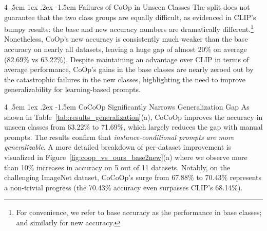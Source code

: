 \documentclass[10pt,twocolumn,letterpaper]{article}
\makeatletter
\renewcommand\paragraph{
  \@startsection{paragraph} {4} {\z@} {.5em \@plus1ex \@minus.2ex} {-1.5em} {\normalfont\normalsize\bfseries} }
\makeatother
\begin{document}
\paragraph{Failures of CoOp in Unseen Classes}
The split does not guarantee that the two class groups are equally difficult, as evidenced in CLIP's bumpy results: the base and new accuracy numbers are dramatically different.\footnote{For convenience, we refer to base accuracy as the performance in base classes; and similarly for new accuracy.} Nonetheless, CoOp's new accuracy is consistently much weaker than the base accuracy on nearly all datasets, leaving a huge gap of almost 20\% on average (82.69\% vs 63.22\%). Despite maintaining an advantage over CLIP in terms of average performance, CoOp's gains in the base classes are nearly zeroed out by the catastrophic failures in the new classes, highlighting the need to improve generalizability for learning-based prompts.

\paragraph{CoCoOp Significantly Narrows Generalization Gap}
As shown in Table~\ref{tab:results_generalization}(a), CoCoOp improves the accuracy in unseen classes from 63.22\% to 71.69\%, which largely reduces the gap with manual prompts. The results confirm that \emph{instance-conditional prompts are more generalizable}. A more detailed breakdown of per-dataset improvement is visualized in Figure~\ref{fig:coop_vs_ours_base2new}(a) where we observe more than 10\% increases in accuracy on 5 out of 11 datasets. Notably, on the challenging ImageNet dataset, CoCoOp's surge from 67.88\% to 70.43\% represents a non-trivial progress (the 70.43\% accuracy even surpasses CLIP's 68.14\%).
\end{document}
